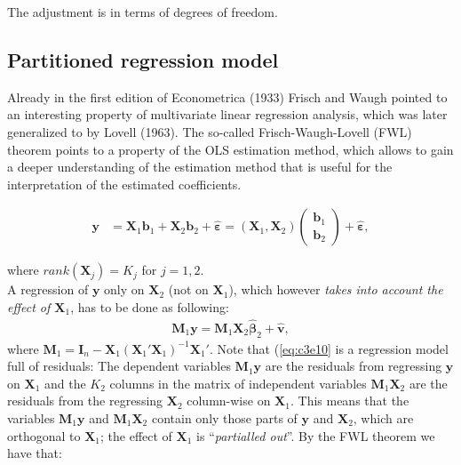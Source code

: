 \documentclass[
]{book}
\begin{document}
The adjustment is in terms of degrees of freedom.

\hypertarget{partitioned-regression-model}{%
\subsection*{Partitioned regression model}\label{partitioned-regression-model}}

Already in the first edition of Econometrica (1933) Frisch and Waugh
pointed to an interesting property of multivariate linear regression
analysis, which was later generalized to by Lovell (1963). The so-called
Frisch-Waugh-Lovell (FWL) theorem points to a property of the OLS
estimation method, which allows to gain a deeper understanding of the
estimation method that is useful for the interpretation of the estimated
coefficients.

\begin{align}
  \mathbf{y} &= \mathbf{X}_1\mathbf{b}_1+\mathbf{X}_2\mathbf{b}_2+\hat{\boldsymbol{\varepsilon}} =  (\mathbf{X}_1,\mathbf{X}_2)\left(\begin{matrix}\mathbf{b}_1\\\mathbf{b}_2\end{matrix}\right)+\hat{\boldsymbol{\varepsilon}},
\label{eq:c3e9}
\end{align}

where \(rank(\mathbf{X}_j)=K_j\) for \(j=1,2\).\\
A regression of \(\mathbf{y}\) only on \(\mathbf{X}_2\) (not on \(\mathbf{X}_1\)), which
however \emph{takes into account the effect of \(\mathbf{X}_1\)}, has to be done as
following:
\begin{align}
  \mathbf{M}_1\mathbf{y} = \mathbf{M}_1\mathbf{X}_2\hat{\boldsymbol{\beta}}_2+\hat{\mathbf{v}},
\label{eq:c3e10}
\end{align}
where \(\mathbf{M}_1=\mathbf{I}_n-\mathbf{X}_1(\mathbf{X}_1'\mathbf{X}_1)^{-1}\mathbf{X}_1'\). Note that (\eqref{eq:c3e10} is a regression model full of residuals: The dependent variables \(\mathbf{M}_1\mathbf{y}\) are the residuals from regressing \(\mathbf{y}\) on \(\mathbf{X}_1\) and the \(K_2\) columns in the matrix of independent variables \(\mathbf{M}_1\mathbf{X}_2\) are the residuals from the regressing \(\mathbf{X}_2\) column-wise on \(\mathbf{X}_1\). This means that the variables \(\mathbf{M}_1\mathbf{y}\) and \(\mathbf{M}_1\mathbf{X}_2\) contain only those parts of \(\mathbf{y}\) and \(\mathbf{X}_2\), which are orthogonal to \(\mathbf{X}_1\); the effect of \(\mathbf{X}_1\) is ``\emph{partialled out}''. By the FWL theorem we have that:
\end{document}
